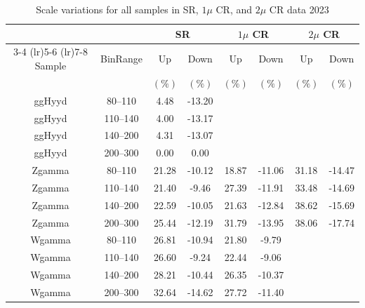 \begin{table}[!htbp]
    \centering
    \caption{Scale variations for all samples in SR, $1\mu$ CR, and $2\mu$ CR data 2023}
    \label{tab:scalevar_results_alternative_2023}
    \setlength{\tabcolsep}{5pt} %
    \begin{tabular}{
        c c | %
        c c | %
        c c | %
        c c   %
    }
        \toprule
        & & \multicolumn{2}{c}{SR} & \multicolumn{2}{c}{$1\mu$ CR} & \multicolumn{2}{c}{$2\mu$ CR} \\
        \cmidrule(lr){3-4} \cmidrule(lr){5-6} \cmidrule(lr){7-8}
        Sample & BinRange & Up & Down & Up & Down & Up & Down \\ %
               &          & $(\%)$ & $(\%)$ & $(\%)$ & $(\%)$ & $(\%)$ & $(\%)$ \\
        \midrule
        ggHyyd & 80--110  & 4.48 & -13.20 & \text{--} & \text{--} & \text{--} & \text{--} \\
        ggHyyd & 110--140 & 4.00 & -13.17 & \text{--} & \text{--} & \text{--} & \text{--} \\
        ggHyyd & 140--200 & 4.31 & -13.07 & \text{--} & \text{--} & \text{--} & \text{--} \\
        ggHyyd & 200--300 & 0.00 & 0.00  & \text{--} & \text{--} & \text{--} & \text{--} \\
        \midrule
        Zgamma & 80--110  & 21.28 & -10.12 & 18.87 & -11.06 & 31.18 & -14.47 \\
        Zgamma & 110--140 & 21.40 & -9.46  & 27.39 & -11.91 & 33.48 & -14.69 \\
        Zgamma & 140--200 & 22.59 & -10.05 & 21.63 & -12.84 & 38.62 & -15.69 \\
        Zgamma & 200--300 & 25.44 & -12.19 & 31.79 & -13.95 & 38.06 & -17.74 \\
        \midrule
        Wgamma & 80--110  & 26.81 & -10.94 & 21.80 & -9.79  & \text{--} & \text{--} \\
        Wgamma & 110--140 & 26.60 & -9.24  & 22.44 & -9.06  & \text{--} & \text{--} \\
        Wgamma & 140--200 & 28.21 & -10.44 & 26.35 & -10.37 & \text{--} & \text{--} \\
        Wgamma & 200--300 & 32.64 & -14.62 & 27.72 & -11.40 & \text{--} & \text{--} \\
        \bottomrule
    \end{tabular}
\end{table}
